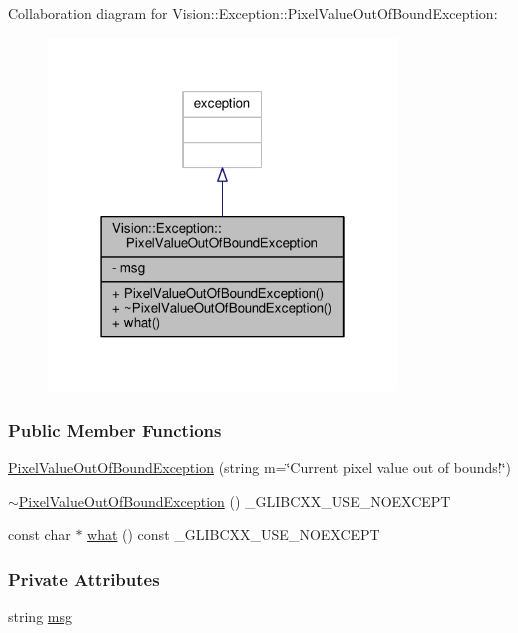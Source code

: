Collaboration diagram for Vision\+:\+:Exception\+:\+:Pixel\+Value\+Out\+Of\+Bound\+Exception\+:
\nopagebreak
\begin{figure}[H]
\begin{center}
\leavevmode
\includegraphics[width=262pt]{class_vision_1_1_exception_1_1_pixel_value_out_of_bound_exception__coll__graph}
\end{center}
\end{figure}
\subsubsection*{Public Member Functions}
\begin{DoxyCompactItemize}
\item 
\hyperlink{class_vision_1_1_exception_1_1_pixel_value_out_of_bound_exception_aabf807476a795d143fb01d076a2c1482}{Pixel\+Value\+Out\+Of\+Bound\+Exception} (string m=\char`\"{}Current pixel value out of bounds!\char`\"{})
\item 
\hyperlink{class_vision_1_1_exception_1_1_pixel_value_out_of_bound_exception_abf1093cf72cf8d1ac5beaee754d68ebc}{$\sim$\+Pixel\+Value\+Out\+Of\+Bound\+Exception} () \+\_\+\+G\+L\+I\+B\+C\+X\+X\+\_\+\+U\+S\+E\+\_\+\+N\+O\+E\+X\+C\+E\+P\+T
\item 
const char $\ast$ \hyperlink{class_vision_1_1_exception_1_1_pixel_value_out_of_bound_exception_a7f72688e1cf7271481dfe9dd591f1d2c}{what} () const \+\_\+\+G\+L\+I\+B\+C\+X\+X\+\_\+\+U\+S\+E\+\_\+\+N\+O\+E\+X\+C\+E\+P\+T
\end{DoxyCompactItemize}
\subsubsection*{Private Attributes}
\begin{DoxyCompactItemize}
\item 
string \hyperlink{class_vision_1_1_exception_1_1_pixel_value_out_of_bound_exception_a5e1cb97c34bdedca34b733d5cf16f8c2}{msg}
\end{DoxyCompactItemize}


